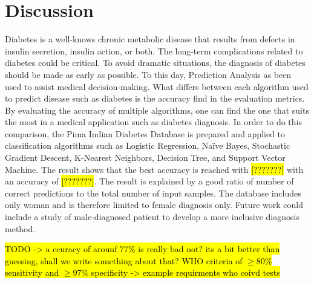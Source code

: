 \documentclass[11pt]{article}
\begin{document}
	\section{Discussion}
	Diabetes is a well-knows chronic metabolic disease that results from defects in insulin secretion, insulin action, or both. The long-term complications related to diabetes could be critical. To avoid dramatic situations, the diagnosis of diabetes should be made as early as possible. To this day, Prediction Analysis as been used to assist medical decision-making. What differs between each algorithm used to predict disease such as diabetes is the accuracy find in the evaluation metrics. By evaluating the accuracy of multiple algorithms, one can find the one that suits the most in a medical application such as diabetes diagnosis. In order to do this comparison, the Pima Indian Diabetes Database is prepared and applied to classification algorithms such as Logistic Regression, Naïve Bayes, Stochastic Gradient Descent, K-Nearest Neighbors, Decision Tree, and Support Vector Machine. The result shows that the best accuracy is reached with \hl{[???????]} with an accuracy of \hl{[???????]}. The result is explained by a good ratio of number of correct predictions to the total number of input samples. The database includes only woman and is therefore limited to female diagnosis only. Future work could include a study of male-diagnosed patient to develop a more inclusive diagnosis method.

	\hl{TODO -> a ccuracy of arounf 77\% is really bad not? its a bit better than guessing, shall we write something about that? WHO criteria of $\geq$80\% sensitivity and $\geq$97\% specificity -> example requirments who coivd tests}
	

\printbibliography
\end{document}
